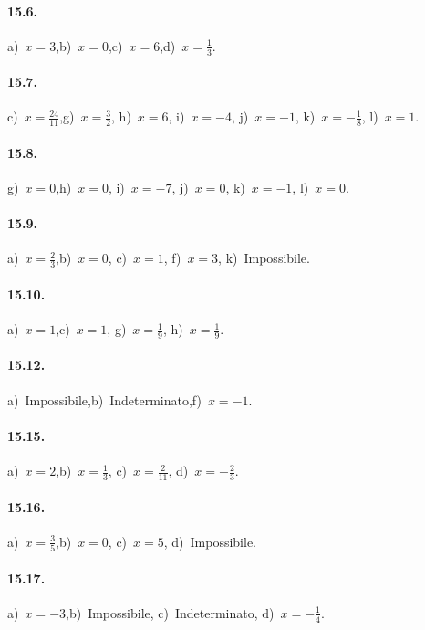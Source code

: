 \paragraph{15.6.}
a)~$x=3$,\quad b)~$x=0$,\quad c)~$x=6$,\quad d)~$x=\frac{1}{3}$.

\paragraph{15.7.}
c)~$x=\frac{24}{11}$,\quad g)~$x=\frac{3}{2}$, \quad h)~$x=6$, \quad i)~$x=-4$, \quad j)~$x=-1$, \quad k)~$x=-\frac{1}{8}$, \quad l)~$x=1$.

\paragraph{15.8.}
g)~$x=0$,\quad h)~$x=0$, \quad i)~$x=-7$, \quad j)~$x=0$, \quad k)~$x=-1$, \quad l)~$x=0$.

\paragraph{15.9.}
a)~$x=\frac{2}{3}$,\quad b)~$x=0$, \quad c)~$x=1$, \quad f)~$x=3$, \quad k)~Impossibile.

\paragraph{15.10.}
a)~$x=1$,\quad c)~$x=1$, \quad g)~$x=\frac{1}{9}$, \quad h)~$x=\frac{1}{9}$.

\paragraph{15.12.}
a)~Impossibile,\quad b)~Indeterminato,\quad f)~$x=-1$.

\paragraph{15.15.}
a)~$x=2$,\quad b)~$x=\frac{1}{3}$, \quad c)~$x=\frac{2}{11}$, \quad d)~$x=-\frac{2}{3}$.

\paragraph{15.16.}
a)~$x=\frac{3}{5}$,\quad b)~$x=0$, \quad c)~$x=5$, \quad d)~Impossibile.

\paragraph{15.17.} %
a)~$x=-3$,\quad b)~Impossibile, \quad c)~Indeterminato, \quad d)~$x=-\frac{1}{4}$.


